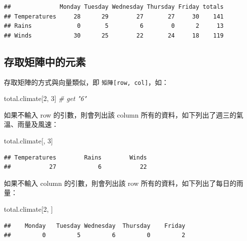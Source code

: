 \documentclass[
]{book}
\newenvironment{Shaded}{\begin{snugshade}}{\end{snugshade}}
\newcommand{\CommentTok}[1]{\textcolor[rgb]{0.56,0.35,0.01}{\textit{#1}}}
\newcommand{\DecValTok}[1]{\textcolor[rgb]{0.00,0.00,0.81}{#1}}
\newcommand{\NormalTok}[1]{#1}
\theoremstyle{definition}
\theoremstyle{remark}
\begin{document}
\begin{verbatim}
##              Monday Tuesday Wednesday Thursday Friday totals
## Temperatures     28      29        27       27     30    141
## Rains             0       5         6        0      2     13
## Winds            30      25        22       24     18    119
\end{verbatim}

\hypertarget{ux5b58ux53d6ux77e9ux9663ux4e2dux7684ux5143ux7d20}{%
\subsection{存取矩陣中的元素}\label{ux5b58ux53d6ux77e9ux9663ux4e2dux7684ux5143ux7d20}}

存取矩陣的方式與向量類似，即 \texttt{矩陣{[}row,\ col{]}}，如：

\begin{Shaded}
\begin{Highlighting}[]
\NormalTok{total.climate[}\DecValTok{2}\NormalTok{, }\DecValTok{3}\NormalTok{]  }\CommentTok{\# get "6"}
\end{Highlighting}
\end{Shaded}

如果不輸入 row 的引數，則會列出該 column 所有的資料，如下列出了週三的氣溫、雨量及風速：

\begin{Shaded}
\begin{Highlighting}[]
\NormalTok{total.climate[, }\DecValTok{3}\NormalTok{]}
\end{Highlighting}
\end{Shaded}

\begin{verbatim}
## Temperatures        Rains        Winds 
##           27            6           22
\end{verbatim}

如果不輸入 column 的引數，則會列出該 row 所有的資料，如下列出了每日的雨量：

\begin{Shaded}
\begin{Highlighting}[]
\NormalTok{total.climate[}\DecValTok{2}\NormalTok{, ]}
\end{Highlighting}
\end{Shaded}

\begin{verbatim}
##    Monday   Tuesday Wednesday  Thursday    Friday 
##         0         5         6         0         2
\end{verbatim}
\end{document}
